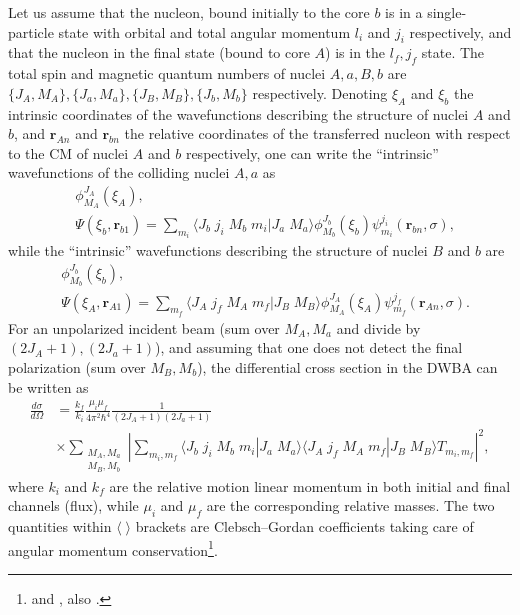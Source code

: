 Let us assume that the nucleon, bound initially to the core $b$ is in a single-particle state with orbital and total angular momentum $l_i$ and  $j_i$ respectively, and that the nucleon in the final state (bound to core $A$)  is in the $l_f,j_f$ state. The total spin and magnetic quantum numbers of nuclei $A,a,B,b$ are $\{J_A,M_A\},\{J_a,M_a\},\{J_B,M_B\},\{J_b,M_b\}$ respectively. Denoting $\xi_A$ and $\xi_b$ the intrinsic coordinates of the wavefunctions describing the structure of nuclei $A$ and $b$, and $\mathbf{r}_{An}$ and $\mathbf{r}_{bn}$ the relative coordinates of the transferred nucleon with respect to the CM of nuclei $A$ and $b$ respectively, one can write the ``intrinsic''  wavefunctions of the colliding nuclei $A,a$ as 
\begin{equation}\label{eq_onept2}
    \begin{split}
    &\phi_{M_A}^{J_A}(\xi_A),\\
    &\Psi(\xi_b,\mathbf{r}_{b1})=\sum_{m_i}\langle J_b\;j_i\;M_b\;m_i|J_a\;M_a\rangle\phi_{M_b}^{J_b}(\xi_b)\psi_{m_i}^{j_i}(\mathbf{r}_{bn},\sigma),
    \end{split}
\end{equation}
while the ``intrinsic'' wavefunctions describing the structure of nuclei $B$ and $b$ are
\begin{equation}\label{eq_onept3}
    \begin{split}
    &\phi_{M_b}^{J_b}(\xi_b),\\
    &\Psi(\xi_A,\mathbf{r}_{A1})=\sum_{m_f}\langle J_A\;j_f\;M_A\;m_f|J_B\;M_B\rangle\phi_{M_A}^{J_A}(\xi_A)\psi_{m_f}^{j_f}(\mathbf{r}_{An},\sigma).
    \end{split}
\end{equation}
For an unpolarized incident beam (sum over $M_A,M_a$ and divide  by $(2J_A+1),(2J_a+1)$), and assuming that  one does not detect the final polarization (sum over $M_B,M_b$), the differential cross section in the DWBA can be written as
\begin{equation}\label{eq_onept4}
    \begin{split}
\frac{d\sigma}{d\Omega}&=\frac{k_f}{k_i}\frac{\mu_i\mu_f}{4\pi^2\hbar^4}\frac{1}{(2J_A+1)(2J_a+1)}\\
&\times\sum_{\substack{M_A,M_a\\M_B,M_b}}\left|\sum_{m_i,m_f}\langle J_b\;j_i\;M_b\;m_i|J_a\;M_a\rangle\langle J_A\;j_f\;M_A\;m_f|J_B\;M_B\rangle T_{m_i,m_f}\right|^2,
    \end{split}
\end{equation}
where $k_i$ and $k_f$ are the relative motion linear momentum in both initial and final channels (flux), while $\mu_i$ and $\mu_f$ are the corresponding relative masses. The two quantities within $\langle\;\rangle$ brackets are Clebsch--Gordan coefficients taking care of angular momentum conservation\footnote{\cite{Brink:68} and \cite{Edmonds:60}, also \cite{Bohr:69}.}.


